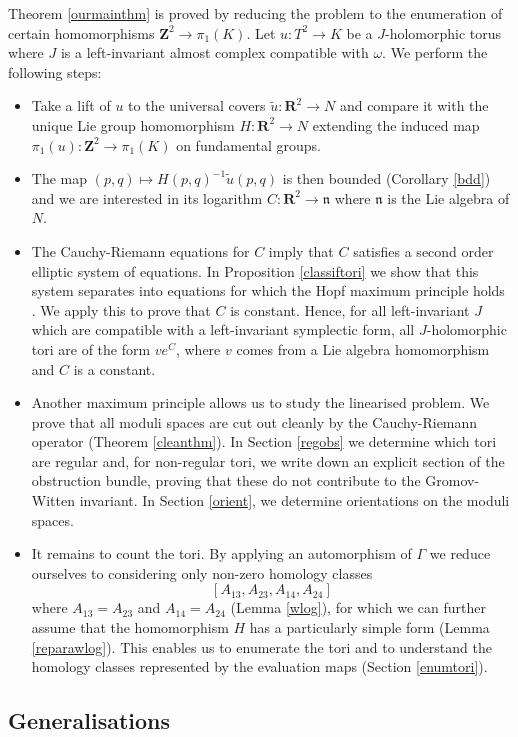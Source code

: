\documentclass[11pt]{amsart}
\newcommand{\RR}{\mathbf{R}}
\newcommand{\ZZ}{\mathbf{Z}}
\newcommand{\nn}{\mathfrak{n}}
\numberwithin{equation}{section}
\theoremstyle{definition}
\theoremstyle{remark}
\begin{document}
Theorem \ref{ourmainthm} is proved by reducing the problem to the enumeration of certain homomorphisms $\ZZ^2\to\pi_1(K)$. Let $u\colon T^2\to K$ be a $J$-holomorphic torus where $J$ is a left-invariant almost complex compatible with $\omega$. We perform the following steps:
\begin{itemize}
\item Take a lift of $u$ to the universal covers $\tilde{u}\colon\RR^2\to N$ and compare it with the unique Lie group homomorphism $H\colon\RR^2\to N$ extending the induced map $\pi_1(u)\colon\ZZ^2\to\pi_1(K)$ on fundamental groups.
\item The map $(p,q)\mapsto H(p,q)^{-1}\tilde{u}(p,q)$ is then bounded (Corollary \ref{bdd}) and we are interested in its logarithm $C\colon\RR^2\to\nn$ where $\nn$ is the Lie algebra of $N$.
\item The Cauchy-Riemann equations for $C$ imply that $C$ satisfies a second order elliptic system of equations. In Proposition \ref{classiftori} we show that this system separates into equations for which the Hopf maximum principle holds \cite[Theorem 3.1]{GT}. We apply this to prove that $C$ is constant. Hence, for all left-invariant $J$ which are compatible with a left-invariant symplectic form, all $J$-holomorphic tori are of the form $ve^C$, where $v$ comes from a Lie algebra homomorphism and $C$ is a constant.
\item Another maximum principle allows us to study the linearised problem. We prove that all moduli spaces are cut out cleanly by the Cauchy-Riemann operator (Theorem \ref{cleanthm}). In Section \ref{regobs} we determine which tori are regular and, for non-regular tori, we write down an explicit section of the obstruction bundle, proving that these do not contribute to the Gromov-Witten invariant. In Section \ref{orient}, we determine orientations on the moduli spaces.
\item It remains to count the tori. By applying an automorphism of $\Gamma$ we reduce ourselves to considering only non-zero homology classes
\[[A_{13},A_{23},A_{14},A_{24}]\]
where $A_{13}=A_{23}$ and $A_{14}=A_{24}$ (Lemma \ref{wlog}), for which we can further assume that the homomorphism $H$ has a particularly simple form (Lemma \ref{reparawlog}). This enables us to enumerate the tori and to understand the homology classes represented by the evaluation maps (Section \ref{enumtori}).
\end{itemize}

\subsection*{Generalisations}
\end{document}
